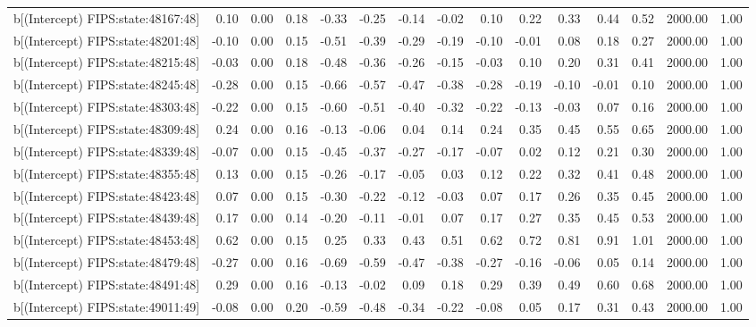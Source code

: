 \begin{table}[ht]
\begin{tabular}{rrrrrrrrrrrrrrr}
  b[(Intercept) FIPS:state:48167:48] & 0.10 & 0.00 & 0.18 & -0.33 & -0.25 & -0.14 & -0.02 & 0.10 & 0.22 & 0.33 & 0.44 & 0.52 & 2000.00 & 1.00 \\ 
  b[(Intercept) FIPS:state:48201:48] & -0.10 & 0.00 & 0.15 & -0.51 & -0.39 & -0.29 & -0.19 & -0.10 & -0.01 & 0.08 & 0.18 & 0.27 & 2000.00 & 1.00 \\ 
  b[(Intercept) FIPS:state:48215:48] & -0.03 & 0.00 & 0.18 & -0.48 & -0.36 & -0.26 & -0.15 & -0.03 & 0.10 & 0.20 & 0.31 & 0.41 & 2000.00 & 1.00 \\ 
  b[(Intercept) FIPS:state:48245:48] & -0.28 & 0.00 & 0.15 & -0.66 & -0.57 & -0.47 & -0.38 & -0.28 & -0.19 & -0.10 & -0.01 & 0.10 & 2000.00 & 1.00 \\ 
  b[(Intercept) FIPS:state:48303:48] & -0.22 & 0.00 & 0.15 & -0.60 & -0.51 & -0.40 & -0.32 & -0.22 & -0.13 & -0.03 & 0.07 & 0.16 & 2000.00 & 1.00 \\ 
  b[(Intercept) FIPS:state:48309:48] & 0.24 & 0.00 & 0.16 & -0.13 & -0.06 & 0.04 & 0.14 & 0.24 & 0.35 & 0.45 & 0.55 & 0.65 & 2000.00 & 1.00 \\ 
  b[(Intercept) FIPS:state:48339:48] & -0.07 & 0.00 & 0.15 & -0.45 & -0.37 & -0.27 & -0.17 & -0.07 & 0.02 & 0.12 & 0.21 & 0.30 & 2000.00 & 1.00 \\ 
  b[(Intercept) FIPS:state:48355:48] & 0.13 & 0.00 & 0.15 & -0.26 & -0.17 & -0.05 & 0.03 & 0.12 & 0.22 & 0.32 & 0.41 & 0.48 & 2000.00 & 1.00 \\ 
  b[(Intercept) FIPS:state:48423:48] & 0.07 & 0.00 & 0.15 & -0.30 & -0.22 & -0.12 & -0.03 & 0.07 & 0.17 & 0.26 & 0.35 & 0.45 & 2000.00 & 1.00 \\ 
  b[(Intercept) FIPS:state:48439:48] & 0.17 & 0.00 & 0.14 & -0.20 & -0.11 & -0.01 & 0.07 & 0.17 & 0.27 & 0.35 & 0.45 & 0.53 & 2000.00 & 1.00 \\ 
  b[(Intercept) FIPS:state:48453:48] & 0.62 & 0.00 & 0.15 & 0.25 & 0.33 & 0.43 & 0.51 & 0.62 & 0.72 & 0.81 & 0.91 & 1.01 & 2000.00 & 1.00 \\ 
  b[(Intercept) FIPS:state:48479:48] & -0.27 & 0.00 & 0.16 & -0.69 & -0.59 & -0.47 & -0.38 & -0.27 & -0.16 & -0.06 & 0.05 & 0.14 & 2000.00 & 1.00 \\ 
  b[(Intercept) FIPS:state:48491:48] & 0.29 & 0.00 & 0.16 & -0.13 & -0.02 & 0.09 & 0.18 & 0.29 & 0.39 & 0.49 & 0.60 & 0.68 & 2000.00 & 1.00 \\ 
  b[(Intercept) FIPS:state:49011:49] & -0.08 & 0.00 & 0.20 & -0.59 & -0.48 & -0.34 & -0.22 & -0.08 & 0.05 & 0.17 & 0.31 & 0.43 & 2000.00 & 1.00 \\ 

\end{tabular}
\end{table}
